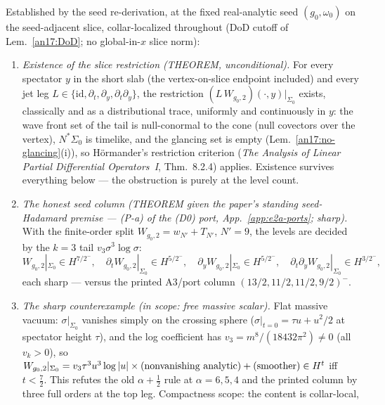 \begin{remark}
\label{an17:d0-record}
Established by the seed re-derivation, at the fixed real-analytic seed
$(g_0,\omega_0)$ on the seed-adjacent slice, collar-localized throughout (DoD
cutoff of Lem.~\ref{an17:DoD}; no global-in-$x$ slice norm):
\begin{enumerate}[label=\textup{(\roman*)},leftmargin=*,nosep]
\item \emph{Existence of the slice restriction (THEOREM, unconditional).} For
  every spectator $y$ in the short slab (the vertex-on-slice endpoint
  included) and every jet leg
  $L\in\{\mathrm{id},\partial_t,\partial_y,\partial_t\partial_y\}$, the
  restriction $(L\,W_{g_0,2})(\cdot,y)|_{\Sigma_0}$ exists, classically and as
  a distributional trace, uniformly and continuously in $y$: the wave front
  set of the tail is null-conormal to the cone (null covectors over the
  vertex), $N^*\Sigma_0$ is timelike, and the glancing set is empty
  (Lem.~\ref{an17:no-glancing}(i)), so H\"ormander's restriction criterion
  (\emph{The Analysis of Linear Partial Differential Operators~I},
  Thm.~8.2.4) applies. Existence survives everything below --- the
  obstruction is purely at the level count.
\item \emph{The honest seed column (THEOREM given the paper's standing
  seed-Hadamard premise --- (P-a) of the (D0) port, App.~\ref{app:e2a-ports};
  sharp).} With the finite-order split $W_{g_0,2}=w_{N'}+T_{N'}$, $N'=9$, the
  levels are decided by the $k{=}3$ tail $v_3\sigma^3\log\sigma$:
  \[
   W_{g_0,2}|_{\Sigma_0}\in H^{7/2^-},\quad
   \partial_tW_{g_0,2}|_{\Sigma_0}\in H^{5/2^-},\quad
   \partial_yW_{g_0,2}|_{\Sigma_0}\in H^{5/2^-},\quad
   \partial_t\partial_yW_{g_0,2}|_{\Sigma_0}\in H^{3/2^-},
  \]
  each sharp --- versus the printed A3/port column $(13/2,11/2,11/2,9/2)^-$.
\item \emph{The sharp counterexample (in scope: free massive scalar).} Flat
  massive vacuum: $\sigma|_{\Sigma_0}$ vanishes simply on the crossing sphere
  ($\sigma|_{t=0}=\tau u+u^2/2$ at spectator height $\tau$), and the log
  coefficient has $v_3=m^8/(18432\pi^2)\neq0$ (all $v_k>0$), so
  $W_{g_0,2}|_{\Sigma_0}=v_3\tau^3u^3\log|u|\times(\textup{nonvanishing
  analytic})+(\textup{smoother})\in H^t$ iff $t<\tfrac72$. This refutes the
  old $\alpha+\tfrac12$ rule at $\alpha=6,5,4$ and the printed column by three
  full orders at the top leg. Compactness scope: the content is collar-local,

\end{enumerate}
\end{remark}

